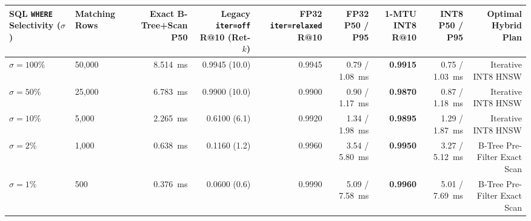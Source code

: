 \begin{table}[t]
{\begin{tabular}{@{}llrrrrrrr@{}}
\textbf{SQL \texttt{WHERE} Selectivity ($\sigma$)} & \textbf{Matching Rows} & \textbf{Exact B-Tree+Scan P50} & \textbf{Legacy \texttt{iter=off} R@10 (Ret-$k$)} & \textbf{FP32 \texttt{iter=relaxed} R@10} & \textbf{FP32 P50 / P95} & \textbf{1-MTU INT8 R@10} & \textbf{INT8 P50 / P95} & \textbf{Optimal Hybrid Plan} \\
\midrule
$\sigma = 100\%$ & 50,000 & 8.514~ms & 0.9945 (10.0) & 0.9945 & 0.79 / 1.08~ms & \textbf{0.9915} & 0.75 / 1.03~ms & Iterative INT8 HNSW \\
$\sigma = 50\%$ & 25,000 & 6.783~ms & 0.9900 (10.0) & 0.9900 & 0.90 / 1.17~ms & \textbf{0.9870} & 0.87 / 1.18~ms & Iterative INT8 HNSW \\
$\sigma = 10\%$ & 5,000 & 2.265~ms & 0.6100 (6.1) & 0.9920 & 1.34 / 1.98~ms & \textbf{0.9895} & 1.29 / 1.87~ms & Iterative INT8 HNSW \\
$\sigma = 2\%$ & 1,000 & 0.638~ms & 0.1160 (1.2) & 0.9960 & 3.54 / 5.80~ms & \textbf{0.9950} & 3.27 / 5.12~ms & B-Tree Pre-Filter Exact Scan \\
$\sigma = 1\%$ & 500 & 0.376~ms & 0.0600 (0.6) & 0.9990 & 5.09 / 7.58~ms & \textbf{0.9960} & 5.01 / 7.69~ms & B-Tree Pre-Filter Exact Scan \\
\bottomrule
\end{tabular}%
}
\end{table}
